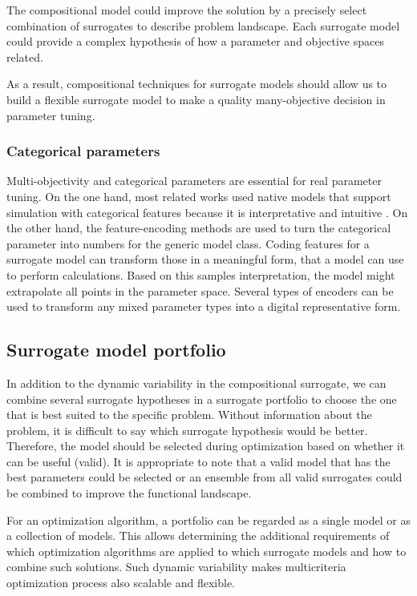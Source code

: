                 The compositional model could improve the solution by a precisely select combination of surrogates to describe problem landscape. Each surrogate model could provide a complex hypothesis of how a parameter and objective spaces related.
                
                As a result, compositional techniques for surrogate models should allow us to build a flexible surrogate model to make a quality many-objective decision in parameter tuning.

            \subsubsection{Categorical parameters} 
                Multi-objectivity and categorical parameters are essential for real parameter tuning. On the one hand, most related works used native models that support simulation with categorical features because it is interpretative and intuitive \cite{HutterHL11, nardi2019practical}. On the other hand, the feature-encoding methods are used to turn the categorical parameter into numbers for the generic model class. Coding features for a surrogate model can transform those in a meaningful form, that a model can use to perform calculations. Based on this samples interpretation, the model might extrapolate all points in the parameter space. Several types of encoders can be used to transform any mixed parameter types into a digital representative form.
            
        
        \subsection{Surrogate model portfolio}
            In addition to the dynamic variability in the compositional surrogate, we can combine several surrogate hypotheses in a surrogate portfolio to choose the one that is best suited to the specific problem.  Without information about the problem, it is difficult to say which surrogate hypothesis would be better. Therefore, the model should be selected during optimization based on whether it can be useful (valid). It is appropriate to note that a valid model that has the best parameters could be selected or an ensemble from all valid surrogates could be combined to improve the functional landscape.

            For an optimization algorithm, a portfolio can be regarded as a single model or as a collection of models. This allows determining the additional requirements of which optimization algorithms are applied to which surrogate models and how to combine such solutions. Such dynamic variability makes multicriteria optimization process also scalable and flexible.
            
